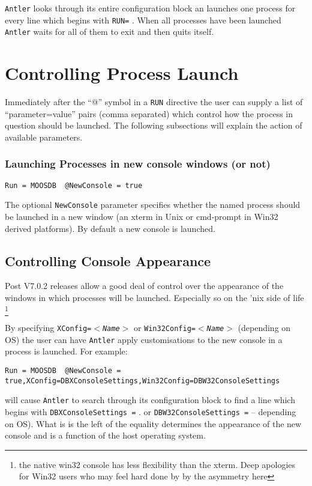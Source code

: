 \documentclass[a4paper,10pt]{article}
\newcommand{\Code}[1]{\texttt{#1} }
\newcommand{\code}[1]{\Code{#1} }
\begin{document}
\code{Antler} looks through its entire configuration block an launches one process for every line which begins with \code{RUN=}. When all processes have been launched \code{Antler} waits for all of them to exit and then quits itself.



\section{Controlling Process Launch}

Immediately after the ``@'' symbol in a \code{RUN} directive the user can supply a list of ``parameter=value'' pairs (comma separated) which control how the process in question should be launched. The following subsections will explain the action of available parameters.


\subsubsection{Launching Processes in new console windows (or not)}

\begin{lstlisting}
Run = MOOSDB  @NewConsole = true
\end{lstlisting}
 
The optional \code{NewConsole} parameter specifies whether the named process
should be launched in a new  window (an xterm in Unix or cmd-prompt in Win32 derived platforms). By default a new console is launched.

\subsection{Controlling Console Appearance}\label{Sec:Appearance}

Post V7.0.2 releases allow a good deal of control over the appearance of the windows in which processes will be launched. Especially so on the 'nix side of life \footnote{the native win32 console has less flexibility than the xterm. Deep apologies for Win32 users who may feel hard done by by the asymmetry here}

By specifying \code{XConfig=$<$\it{Name}$>$} or \code{Win32Config=$<$\it{Name}$>$} (depending on OS) the user can have \code{Antler} apply customisations to the new console in a process is launched. For example:
\begin{lstlisting}
Run = MOOSDB  @NewConsole = true,XConfig=DBXConsoleSettings,Win32Config=DBW32ConsoleSettings
\end{lstlisting}
will cause \code{Antler} to search through its configuration block to find a line which begins with \code{DBXConsoleSettings =}. or   \code{DBW32ConsoleSettings =} -- depending on OS). What is is the left of the equality determines the appearance of the new console and is a function of the host operating system.
\end{document}
